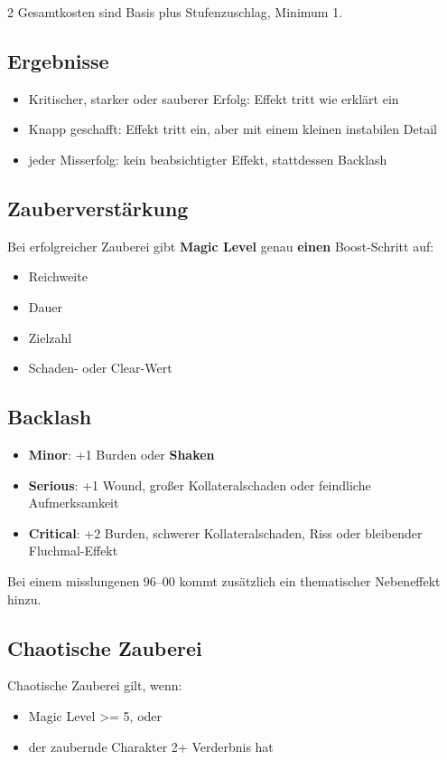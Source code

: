 \begin{multicols*}{2}
Gesamtkosten sind Basis plus Stufenzuschlag, Minimum 1.

\subsection{Ergebnisse}
\begin{itemize}[leftmargin=*]
\item Kritischer, starker oder sauberer Erfolg: Effekt tritt wie erklärt ein
\item Knapp geschafft: Effekt tritt ein, aber mit einem kleinen instabilen Detail
\item jeder Misserfolg: kein beabsichtigter Effekt, stattdessen Backlash
\end{itemize}

\subsection{Zauberverstärkung}
Bei erfolgreicher Zauberei gibt \textbf{Magic Level} genau \textbf{einen} Boost-Schritt auf:
\begin{itemize}[leftmargin=*]
\item Reichweite
\item Dauer
\item Zielzahl
\item Schaden- oder Clear-Wert
\end{itemize}

\subsection{Backlash}
\begin{itemize}[leftmargin=*]
\item \textbf{Minor}: +1 Burden oder \textbf{Shaken}
\item \textbf{Serious}: +1 Wound, großer Kollateralschaden oder feindliche Aufmerksamkeit
\item \textbf{Critical}: +2 Burden, schwerer Kollateralschaden, Riss oder bleibender Fluchmal-Effekt
\end{itemize}

Bei einem misslungenen 96--00 kommt zusätzlich ein thematischer Nebeneffekt hinzu.

\subsection{Chaotische Zauberei}
Chaotische Zauberei gilt, wenn:
\begin{itemize}[leftmargin=*]
\item Magic Level >= 5, oder
\item der zaubernde Charakter 2+ Verderbnis hat
\end{itemize}


\end{multicols*}

